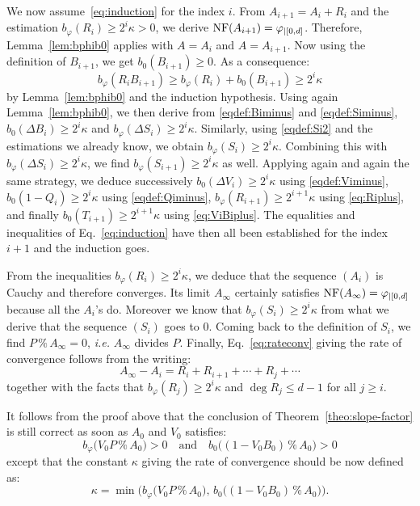 \documentclass{sig-alternate-2013}
\newcommand{\NF}{\text{\rm NF}}
\renewcommand{\mod}{\,\%\,}
\begin{document}
We now assume~\eqref{eq:induction} for the index $i$.
From $A_{i+1} = A_i + R_i$ and the estimation $b_\varphi(R_i) \geq 2^i 
\kappa > 0$, we derive $\NF(A_{i+1}) = \varphi_{|[0,d]}$. Therefore,
Lemma~\ref{lem:bphib0} applies with $A = A_i$ and $A = A_{i+1}$.
Now using the definition of $B_{i+1}$, we get $b_0(B_{i+1}) \geq 0$.
As a consequence:
$$b_\varphi(R_i B_{i+1}) \geq b_\varphi(R_i) + b_0(B_{i+1})
\geq 2^i \kappa$$
by Lemma~\ref{lem:bphib0} and the induction hypothesis.
Using again Lemma~\ref{lem:bphib0}, we then derive from 
\eqref{eqdef:Biminus} and \eqref{eqdef:Siminus}, $b_0(\Delta B_i) \geq 
2^i \kappa$ and $b_\varphi(\Delta S_i) \geq 2^i \kappa$.
Similarly, using \eqref{eqdef:Si2} and the estimations we already know,
we obtain $b_\varphi(S_i) \geq 2^i \kappa$. Combining this with
$b_\varphi(\Delta S_i) \geq 2^i \kappa$, we find
$b_\varphi(S_{i+1}) \geq 2^i \kappa$ as well. Applying again and again
the same strategy, we deduce successively
$b_0(\Delta V_i) \geq 2^i \kappa$ using \eqref{eqdef:Viminus},
$b_0(1{-}Q_i) \geq 2^i \kappa$ using \eqref{eqdef:Qiminus},
$b_\varphi(R_{i+1}) \geq 2^{i+1} \kappa$ using \eqref{eq:Riplus},
and finally $b_0(T_{i+1}) \geq 2^{i+1} \kappa$
using \eqref{eq:ViBiplus}. The equalities and inequalities
of Eq.~\eqref{eq:induction} have then all been established for
the index $i+1$ and the induction goes.

From the inequalities $b_\varphi(R_i) \geq 2^i \kappa$, we deduce that 
the sequence $(A_i)$ is Cauchy and therefore converges. Its limit 
$A_\infty$ certainly satisfies $\NF(A_\infty) = \varphi_{|[0,d]}$ because 
all the $A_i$'s do. Moreover we know that $b_\varphi(S_i) \geq 2^i 
\kappa$ from what we derive that the sequence $(S_i)$ goes to $0$.
Coming back to the definition of $S_i$, we find $P \mod A_\infty = 0$,
\emph{i.e.} $A_\infty$ divides $P$. Finally, Eq.~\eqref{eq:rateconv}
giving the rate of convergence follows from the writing:
$$A_\infty - A_i = R_i + R_{i+1} + \cdots + R_j + \cdots$$
together with the facts that $b_\varphi(R_j) \geq 2^i \kappa$ and $\deg 
R_j \leq d{-}1$ for all $j \geq i$.

\begin{rem}
\label{rem:slope-factor}
It follows from the proof above that the conclusion of 
Theorem~\ref{theo:slope-factor} is still correct as soon as $A_0$ 
and $V_0$ satisfies:
$$b_\varphi\big(V_0 P \mod A_0\big) > 0
\quad \text{and} \quad
b_0\big((1 - V_0 B_0) \mod A_0\big) > 0$$
except that the constant $\kappa$ giving the rate of convergence
should be now defined as:
$$\kappa = \min \big( 
b_\varphi\big(V_0 P \mod A_0\big), \,
b_0\big((1 - V_0 B_0) \mod A_0\big)\big).$$
\end{rem}
\end{document}
